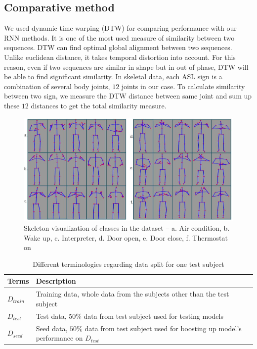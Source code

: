 \documentclass[10pt,twocolumn,letterpaper]{article}
\begin{document}
\subsection{Comparative method}
We used dynamic time warping (DTW) for comparing performance with our RNN methods. It is one of the most used measure of similarity between two sequences. DTW can find optimal global alignment between two sequences. Unlike euclidean distance, it takes temporal distortion into account. For this reason, even if two sequences are similar in shape but in out of phase, DTW will be able to find significant similarity. In skeletal data, each ASL sign is a combination of several body joints, $12$ joints in our case. To calculate similarity between two sign, we measure the DTW distance between same joint and sum up these $12$ distances to get the total similarity measure.
\begin{figure}
	\begin{center}
		\includegraphics[width=.8\linewidth]{sk_data_viz}
	\end{center}
	\caption{Skeleton visualization of classes in the dataset -- a. Air condition, b. Wake up, c. Interpreter, d. Door open, e. Door close, f. Thermostat on}
	\label{fig:sk_dat_viz}
\end{figure}


\begin{table}[h]
	\begin{center}
		\begin{tabular}{|m{1cm}|m{5cm}|}
			\hline
			Terms & Description\\
			\hline\hline
			$D_{train}$ & Training data, whole data from the subjects other than the test subject \\
			\hline
			$D_{test}$ & Test data, $50\%$ data from test subject used for testing models\\
			\hline
			$D_{seed}$ & Seed data, $50\%$ data from test subject used for boosting up model's performance on $D_{test}$\\
			\hline
		\end{tabular}
	\end{center}
	\caption{Different terminologies regarding data split for one test subject}
	\label{table:terminology_eval}
\end{table}
\end{document}

